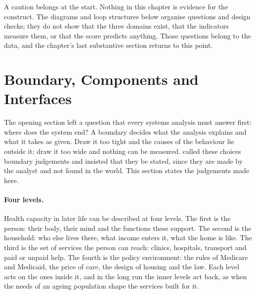 A caution belongs at the start. Nothing in this chapter is evidence for the
construct. The diagrams and loop structures below organise questions and
design checks; they do not show that the three domains exist, that the
indicators measure them, or that the score predicts anything. Those questions
belong to the data, and the chapter's last substantive section returns to this
point.

\section{Boundary, Components and Interfaces}
\label{sec:sys-boundary}

The opening section left a question that every systems analysis must answer
first: where does the system end? A boundary decides what the analysis
explains and what it takes as given. Draw it too tight and the causes of the
behaviour lie outside it; draw it too wide and nothing can be measured.
\citet{checkland_1981} called these choices boundary judgements and insisted
that they be stated, since they are made by the analyst and not found in the
world. This section states the judgements made here.

\paragraph{Four levels.} Health capacity in later life can be described at
four levels. The first is the person: their body, their mind and the
functions these support. The second is the household: who else lives there,
what income enters it, what the home is like. The third is the set of
services the person can reach: clinics, hospitals, transport and paid or
unpaid help. The fourth is the policy environment: the rules of Medicare and
Medicaid, the price of care, the design of housing and the law. Each level
acts on the ones inside it, and in the long run the inner levels act back, as
when the needs of an ageing population shape the services built for it.

